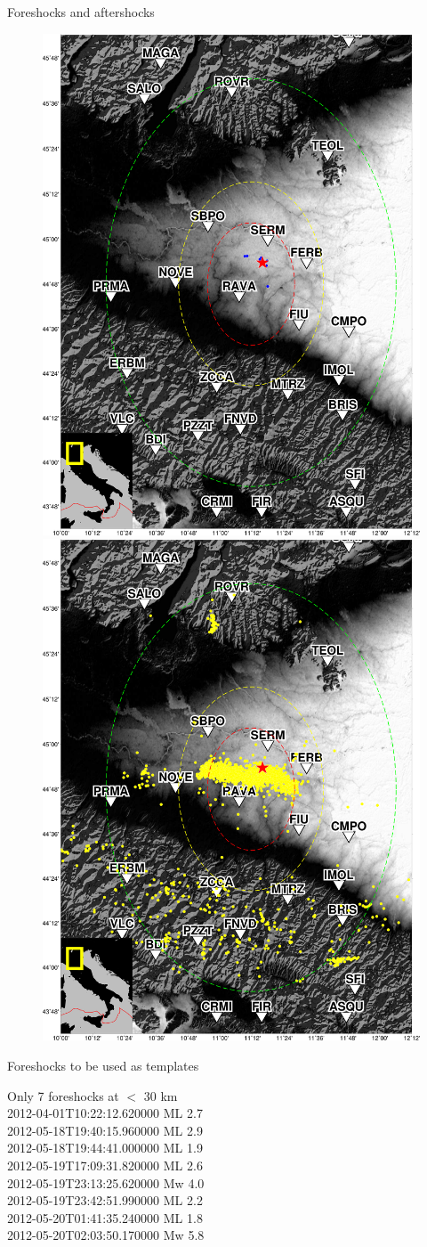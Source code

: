 \documentclass[aspectratio=43,9pt]{beamer}
\begin{document}
\begin{frame}{Foreshocks and aftershocks}

\begin{figure}
 \includegraphics[width=0.48\linewidth]{figs/map.pdf}
 \includegraphics[width=0.48\linewidth]{figs/map_events.pdf}
\end{figure}
 
\end{frame}


\begin{frame}{Foreshocks to be used as templates}

 \centering Only 7 foreshocks at $<$ 30 km \\
 \vskip 0.4cm
2012-04-01T10:22:12.620000 ML 2.7 \\
2012-05-18T19:40:15.960000 ML 2.9 \\
2012-05-18T19:44:41.000000 ML 1.9 \\
2012-05-19T17:09:31.820000 ML 2.6 \\
2012-05-19T23:13:25.620000 Mw 4.0 \\
2012-05-19T23:42:51.990000 ML 2.2 \\
2012-05-20T01:41:35.240000 ML 1.8 \\
\vskip 0.2cm
2012-05-20T02:03:50.170000 Mw 5.8 

\end{frame}
\end{document}
